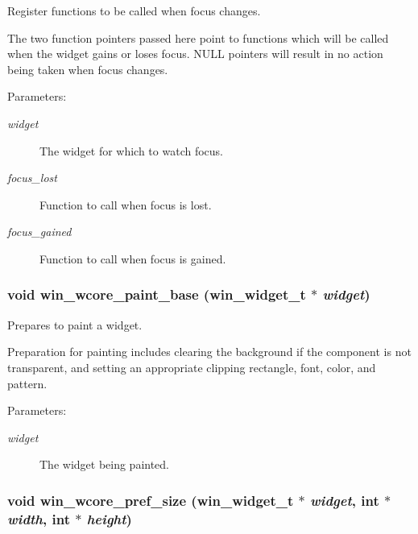 Register functions to be called when focus changes. 

The two function pointers passed here point to functions which will be called when the widget gains or loses focus. NULL pointers will result in no action being taken when focus changes.

\begin{Desc}
\item[Parameters:]
\begin{description}
\item[{\em widget}]The widget for which to watch focus. \item[{\em focus\_\-lost}]Function to call when focus is lost. \item[{\em focus\_\-gained}]Function to call when focus is gained. \end{description}
\end{Desc}
\subsubsection{\setlength{\rightskip}{0pt plus 5cm}void win\_\-wcore\_\-paint\_\-base ({\bf win\_\-widget\_\-t} $\ast$ {\em widget})}\label{wincore_8h_a3}


Prepares to paint a widget. 

Preparation for painting includes clearing the background if the component is not transparent, and setting an appropriate clipping rectangle, font, color, and pattern.

\begin{Desc}
\item[Parameters:]
\begin{description}
\item[{\em widget}]The widget being painted. \end{description}
\end{Desc}
\subsubsection{\setlength{\rightskip}{0pt plus 5cm}void win\_\-wcore\_\-pref\_\-size ({\bf win\_\-widget\_\-t} $\ast$ {\em widget}, int $\ast$ {\em width}, int $\ast$ {\em height})}\label{wincore_8h_a2}


